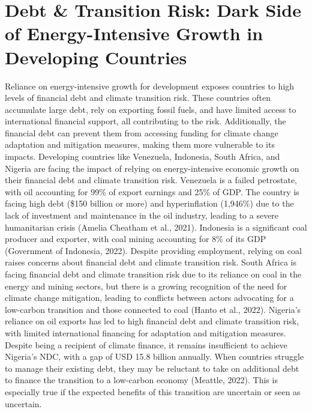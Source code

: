 \documentclass[12pt,a4paper]{article}
\begin{document}
\section*{Debt \& Transition Risk: Dark Side of Energy-Intensive Growth in Developing Countries}
Reliance on energy-intensive growth for development exposes countries to high levels of financial debt and climate transition risk. These countries often accumulate large debt, rely on exporting fossil fuels, and have limited access to international financial support, all contributing to the risk. Additionally, the financial debt can prevent them from accessing funding for climate change adaptation and mitigation measures, making them more vulnerable to its impacts. Developing countries like Venezuela, Indonesia, South Africa, and Nigeria are facing the impact of relying on energy-intensive economic growth on their financial debt and climate transition risk. Venezuela is a failed petrostate, with oil accounting for 99\% of export earnings and 25\% of GDP. The country is facing high debt (\$150 billion or more) and hyperinflation (1,946\%) due to the lack of investment and maintenance in the oil industry, leading to a severe humanitarian crisis (Amelia Cheatham et al., 2021). Indonesia is a significant coal producer and exporter, with coal mining accounting for 8\% of its GDP (Government of Indonesia, 2022). Despite providing employment, relying on coal raises concerns about financial debt and climate transition risk. South Africa is facing financial debt and climate transition risk due to its reliance on coal in the energy and mining sectors, but there is a growing recognition of the need for climate change mitigation, leading to conflicts between actors advocating for a low-carbon transition and those connected to coal (Hanto et al., 2022). Nigeria's reliance on oil exports has led to high financial debt and climate transition risk, with limited international financing for adaptation and mitigation measures. Despite being a recipient of climate finance, it remains insufficient to achieve Nigeria's NDC, with a gap of USD 15.8 billion annually. When countries struggle to manage their existing debt, they may be reluctant to take on additional debt to finance the transition to a low-carbon economy (Meattle, 2022). This is especially true if the expected benefits of this transition are uncertain or seen as uncertain. 
\end{document}
